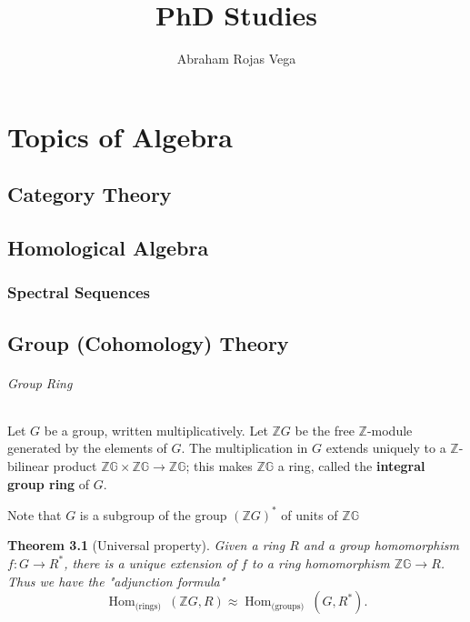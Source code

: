 \documentclass{book}
\title{PhD Studies}
\author{Abraham Rojas Vega}
\newtheorem{theo}{Theorem}
\begin{document}
\maketitle

\tableofcontents
\part{Topics of Algebra}


\chapter{Category Theory}

\chapter{Homological Algebra}

\section{Spectral Sequences}



\chapter{Group (Cohomology) Theory} 

\paragraph*{Group Ring}

Let $G$ be a group, written multiplicatively. Let $\mathbb{Z} G$ be the free $\mathbb{Z}$-module generated by the elements of $G$. The multiplication in $G$ extends uniquely to a $\mathbb{Z}$-bilinear product $\mathbb{Z G} \times \mathbb{Z G} \rightarrow \mathbb{Z G}$; this makes $\mathbb{Z G}$ a ring, called the \textbf{integral group ring} of $G$.

Note that $G$ is a subgroup of the group $(\mathbb{Z} G)^*$ of units of $\mathbb{Z G}$ 
\begin{theo}[Universal property]
Given a ring $R$ and a group homomorphism $f: G \rightarrow R^*$, there is a unique extension of $f$ to a ring homomorphism $\mathbb{Z G} \rightarrow R$. Thus we have the "adjunction formula"
    $$
    \operatorname{Hom}_{\text {(rings) }}(\mathbb{Z} G, R) \approx \operatorname{Hom}_{\text {(groups) }}\left(G, R^*\right) .
    $$
\end{theo}
\end{document}
